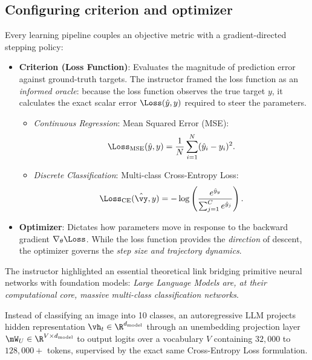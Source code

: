 \documentclass[../labs.tex]{subfiles}
\begin{document}
\subsection{Configuring criterion and optimizer}
Every learning pipeline couples an objective metric with a gradient-directed stepping policy:
\begin{itemize}
    \item \textbf{Criterion (Loss Function)}: Evaluates the magnitude of prediction error against ground-truth targets. The instructor framed the loss function as an \emph{informed oracle}: because the loss function observes the true target $y$, it calculates the exact scalar error $\Loss(\hat{y}, y)$ required to steer the parameters.
    \begin{itemize}
        \item \emph{Continuous Regression}: Mean Squared Error (MSE):
        \begin{equation}
        \Loss_{\text{MSE}}(\hat{y}, y) = \frac{1}{N} \sum_{i=1}^N (\hat{y}_i - y_i)^2.
        \end{equation}
        \item \emph{Discrete Classification}: Multi-class Cross-Entropy Loss:
        \begin{equation}
        \Loss_{\text{CE}}(\hat{\vy}, y) = -\log\left(\frac{e^{\hat{y}_y}}{\sum_{j=1}^C e^{\hat{y}_j}}\right).
        \end{equation}
    \end{itemize}
    \item \textbf{Optimizer}: Dictates how parameters move in response to the backward gradient $\nabla_\theta \Loss$. While the loss function provides the \emph{direction} of descent, the optimizer governs the \emph{step size and trajectory dynamics}.
\end{itemize}

\begin{examinsight}
The instructor highlighted an essential theoretical link bridging primitive neural networks with foundation models: \emph{Large Language Models are, at their computational core, massive multi-class classification networks}. 

Instead of classifying an image into 10 classes, an autoregressive LLM projects hidden representation $\vh_t \in \R^{d_{\text{model}}}$ through an unembedding projection layer $\mW_U \in \R^{V \times d_{\text{model}}}$ to output logits over a vocabulary $V$ containing $32{,}000$ to $128{,}000+$ tokens, supervised by the exact same Cross-Entropy Loss formulation.
\end{examinsight}
\end{document}
